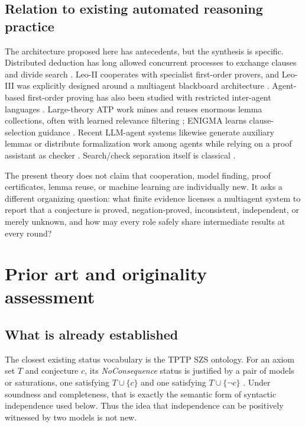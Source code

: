 \documentclass[11pt]{article}
\theoremstyle{definition}
\theoremstyle{remark}
\begin{document}
\subsection{Relation to existing automated reasoning practice}
The architecture proposed here has antecedents, but the synthesis is specific. Distributed deduction has long allowed concurrent processes to exchange clauses and divide search \cite{BonacinaHsiang1995,DenzingerKronenburgSchulz1997,Fuchs1998}. Leo-II cooperates with specialist first-order provers, and Leo-III was explicitly designed around a multiagent blackboard architecture \cite{LeoII,WisniewskiBenzmuller2016}. Agent-based first-order proving has also been studied with restricted inter-agent languages \cite{Kim2016}. Large-theory ATP work mines and reuses enormous lemma collections, often with learned relevance filtering \cite{KaliszykUrban2015,KaliszykUrbanVyskocil2015}; ENIGMA learns clause-selection guidance \cite{JakubuvUrban2017}. Recent LLM-agent systems likewise generate auxiliary lemmas or distribute formalization work among agents while relying on a proof assistant as checker \cite{ProverAgent2025,AgentHunt2026}. Search/check separation itself is classical \cite{HarrisonThery1998}.

The present theory does not claim that cooperation, model finding, proof certificates, lemma reuse, or machine learning are individually new. It asks a different organizing question: what finite evidence licenses a multiagent system to report that a conjecture is proved, negation-proved, inconsistent, independent, or merely unknown, and how may every role safely share intermediate results at every round?

\section{Prior art and originality assessment}

\subsection{What is already established}
The closest existing status vocabulary is the TPTP SZS ontology. For an axiom set $T$ and conjecture $c$, its \emph{NoConsequence} status is justified by a pair of models or saturations, one satisfying $T\cup\{c\}$ and one satisfying $T\cup\{\neg c\}$ \cite{SZS}. Under soundness and completeness, that is exactly the semantic form of syntactic independence used below. Thus the idea that independence can be positively witnessed by two models is not new.
\end{document}
